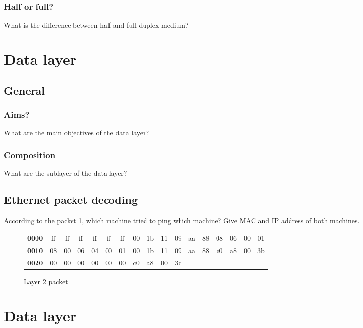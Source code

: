\documentclass[11pt]{article}
\begin{document}
\subsubsection{Half or full?}
What is the difference between half and full duplex medium?

\section{Data layer}
\subsection{General}
\subsubsection{Aims?}
What are the main objectives of the data layer?
\subsubsection{Composition}
What are the sublayer of the data layer?

\subsection{Ethernet packet decoding}
According to the packet \ref{fig:arp_req_ex}, which machine tried to ping which machine? Give MAC and IP address of both machines.
  \begin{figure}[h]
  \centering
  \resizebox{17cm}{!} {
    \begin{tabular}{lcccccccccccccccc}
      \textbf{0000} & ff & ff & ff & ff & ff & ff & 00 & 1b & 11 & 09 & aa & 88 & 08 & 06 & 00 & 01 \\
      \textbf{0010} & 08 & 00 & 06 & 04 & 00 & 01 & 00 & 1b & 11 & 09 & aa & 88 & c0 & a8 & 00 & 3b \\
      \textbf{0020} & 00 & 00 & 00 & 00 & 00 & 00 & c0 & a8 & 00 & 3c \\
    \end{tabular}
  }
  \caption{Layer 2 packet}
  \label{fig:arp_req_ex}
  \end{figure}

\pagebreak
\section{Data layer}
\end{document}
